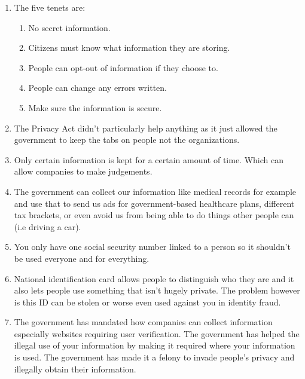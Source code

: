 \documentclass[12pt]{article}
\begin{document}
\begin{enumerate}
        \item The five tenets are:
        \begin{enumerate}
            \item No secret information.
            \item Citizens must know what information they are storing.
            \item People can opt-out of information if they choose to.
            \item People can change any errors written.
            \item Make sure the information is secure.
        \end{enumerate}
        \item The Privacy Act didn't particularly help anything as it just allowed the government to keep the tabs on people not the organizations.
        \item Only certain information is kept for a certain amount of time. Which can allow companies to make judgements.
        \item The government can collect our information like medical records for example and use that to send us ads for government-based healthcare plans, different tax brackets, or even avoid us from being able to do things other people can (i.e driving a car).
        \item You only have one social security number linked to a person so it shouldn't be used everyone and for everything.
        \item National identification card allows people to distinguish who they are and it also lets people use something that isn't hugely private. The problem however is this ID can be stolen or worse even used against you in identity fraud.
        \item The government has mandated how companies can collect information especially websites requiring user verification. The government has helped the illegal use of your information by making it required where your information is used. The government has made it a felony to invade people's privacy and illegally obtain their information. 
    \end{enumerate}
\end{document}
